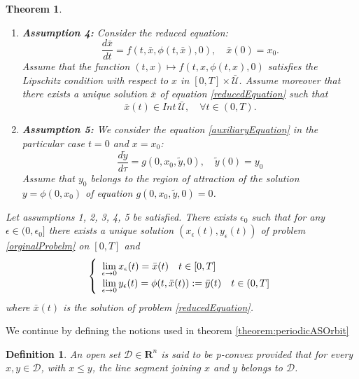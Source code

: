 \documentclass{article}
\newtheorem{theorem}{Theorem}
\newtheorem{definition}{Definition}
\begin{document}
\begin{theorem}
\begin{enumerate}
Assume that the solution $\tilde{y}_0 := \phi(t, x)$ of equation  \eqref{auxiliaryEquation} is asymptocially stable, uniformly with respect to $(t,x) \in [0, T]\times \mathcal{\bar{U}}$.

\item \textbf{Assumption 4:} 
Consider the reduced equation:
\begin{equation}\label{reducedEquation}
\dfrac{d\bar{x}}{dt} = f(t,\bar{x},\phi(t,\bar{x}), 0), \quad \bar{x}(0) = x_0.
\end{equation}
Assume that the function $(t,x) \mapsto f(t,x,\phi(t,x), 0)$ satisfies the Lipschitz condition with respect to $x$ in $[0, T]\times \mathcal{\bar{U}}$. Assume moreover that there exists a unique solution $\bar{x}$ of equation \eqref{reducedEquation} such that $$\bar{x}(t) \in Int \: \mathcal{\bar{U}}, \quad \forall t \in (0,T).$$

\item \textbf{Assumption 5:} We consider the equation \eqref{auxiliaryEquation} in the particular case $t=0$ and $x = x_0$:
\begin{equation}\label{auxiliaryEquation, 0}
\dfrac{d \tilde{y}}{d \tau} =  g(0, x_0,\tilde{y},0), \quad \tilde{y}(0) = y_0
\end{equation}
Assume that $y_0$ belongs to the region of attraction of the solution $y = \phi(0, x_0)$ of equation $g(0, x_0,\tilde{y},0) = 0$.
\end{enumerate}

Let assumptions 1, 2, 3, 4, 5 be satisfied. There exists $\epsilon_0$ such that for any $\epsilon \in (0, \epsilon_0]$ there exists a unique solution $(x_\epsilon(t), y_\epsilon(t))$ of problem \eqref{orginalProbelm} on $[0,T]$ and
\begin{equation}
\def\arraystretch{1.2}
\left\lbrace \begin{array}{l}
\lim\limits_{\epsilon \rightarrow 0}{x_\epsilon(t)} = \bar{x}(t) \quad t \in [0,T] \\
\lim\limits_{\epsilon \rightarrow 0} y_\epsilon(t) = \phi(t, \bar{x}(t)) := \bar{y}(t) \quad t \in (0,T] \\
\end{array} \right.
\end{equation}
where $\bar{x}(t)$ is the solution of problem \eqref{reducedEquation}.
\end{theorem}

We continue by defining the notions used in theorem \eqref{theorem:periodicASOrbit}
\begin{definition}
An open set $\mathcal{D} \in \mathbf{R}^n$ is said to be p-convex provided that for every $x, y \in \mathcal{D}$, with $x \leq y$, the line segment joining $x$ and $y$ belongs to $\mathcal{D}$.
\end{definition}
\end{document}
